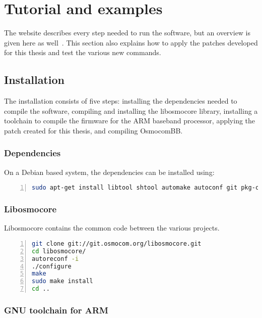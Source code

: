 \chapter{Tutorial and examples}
\label{app:tuto}

The  website describes every step needed to run the
software, but an overview is given here as well~\cite{osmocombb_2015}.
This section also explains how to apply the patches developed for this
thesis and test the various new commands.

\section{Installation}

The installation consists of five steps: installing the dependencies
needed to compile the software, compiling and installing the libosmocore
library, installing a toolchain to compile the firmware for the ARM
baseband processor, applying the patch created for this thesis, and
compiling OsmocomBB.

\subsection{Dependencies}

On a Debian based system, the dependencies can be installed using:

      \begin{lstlisting}[language=bash, numbers=left,
      basicstyle=\footnotesize, breaklines=true, frame=single]
sudo apt-get install libtool shtool automake autoconf git pkg-config make gcc libpcsclite-dev
      \end{lstlisting}

\subsection{Libosmocore}

Libosmocore contains the common code between the various 
projects.

      \begin{lstlisting}[language=bash, numbers=left,
      basicstyle=\footnotesize, breaklines=true, frame=single]
git clone git://git.osmocom.org/libosmocore.git
cd libosmocore/
autoreconf -i
./configure
make
sudo make install
cd ..
      \end{lstlisting}

\subsection{GNU toolchain for ARM}

